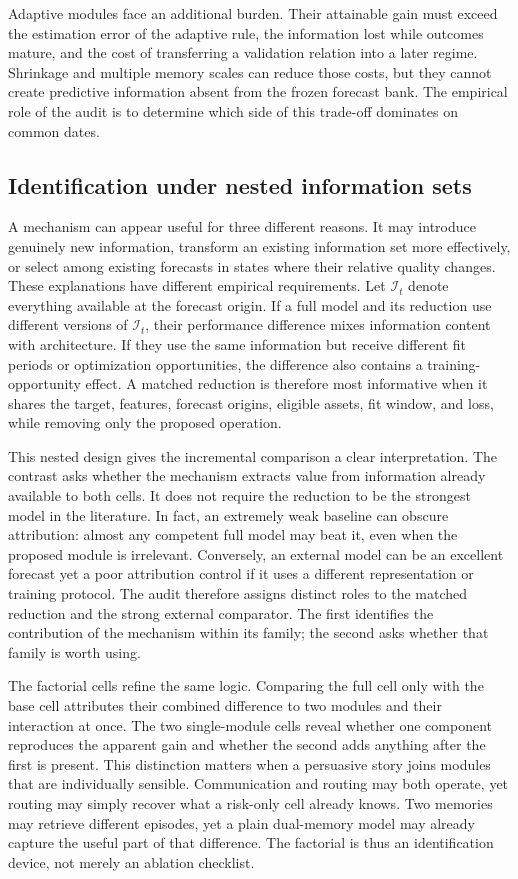 \documentclass{crebss}
\begin{document}
Adaptive modules face an additional burden. Their attainable gain must exceed the estimation error of the adaptive rule, the information lost while outcomes mature, and the cost of transferring a validation relation into a later regime. Shrinkage and multiple memory scales can reduce those costs, but they cannot create predictive information absent from the frozen forecast bank. The empirical role of the audit is to determine which side of this trade-off dominates on common dates.

\subsection{Identification under nested information sets}

A mechanism can appear useful for three different reasons. It may introduce genuinely new information, transform an existing information set more effectively, or select among existing forecasts in states where their relative quality changes. These explanations have different empirical requirements. Let $\mathcal{I}_t$ denote everything available at the forecast origin. If a full model and its reduction use different versions of $\mathcal{I}_t$, their performance difference mixes information content with architecture. If they use the same information but receive different fit periods or optimization opportunities, the difference also contains a training-opportunity effect. A matched reduction is therefore most informative when it shares the target, features, forecast origins, eligible assets, fit window, and loss, while removing only the proposed operation.

This nested design gives the incremental comparison a clear interpretation. The contrast asks whether the mechanism extracts value from information already available to both cells. It does not require the reduction to be the strongest model in the literature. In fact, an extremely weak baseline can obscure attribution: almost any competent full model may beat it, even when the proposed module is irrelevant. Conversely, an external model can be an excellent forecast yet a poor attribution control if it uses a different representation or training protocol. The audit therefore assigns distinct roles to the matched reduction and the strong external comparator. The first identifies the contribution of the mechanism within its family; the second asks whether that family is worth using.

The factorial cells refine the same logic. Comparing the full cell only with the base cell attributes their combined difference to two modules and their interaction at once. The two single-module cells reveal whether one component reproduces the apparent gain and whether the second adds anything after the first is present. This distinction matters when a persuasive story joins modules that are individually sensible. Communication and routing may both operate, yet routing may simply recover what a risk-only cell already knows. Two memories may retrieve different episodes, yet a plain dual-memory model may already capture the useful part of that difference. The factorial is thus an identification device, not merely an ablation checklist.
\end{document}
